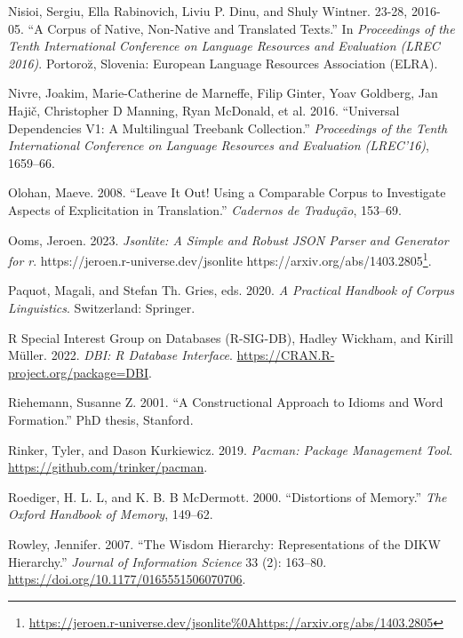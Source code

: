 \documentclass[
  letterpaper,
  DIV=11,
  numbers=noendperiod]{scrreport}
\newlength{\cslhangindent}
\newlength{\cslentryspacingunit} %
\newenvironment{CSLReferences}[2] %
 {%
  \setlength{\parindent}{0pt}
  \ifodd #1
  \let\oldpar\par
  \def\par{\hangindent=\cslhangindent\oldpar}
  \fi
  \setlength{\parskip}{#2\cslentryspacingunit}
 }%
 {}
\theoremstyle{definition}
\theoremstyle{remark}
\DeclareRobustCommand{\href}[2]{#2\footnote{\url{#1}}}
\begin{document}
\begin{CSLReferences}{1}{0}
\leavevmode{}%
Nisioi, Sergiu, Ella Rabinovich, Liviu P. Dinu, and Shuly Wintner.
23-28, 2016-05. {``A Corpus of Native, Non-Native and Translated
Texts.''} In \emph{Proceedings of the Tenth International Conference on
Language Resources and Evaluation (LREC 2016)}. Portoro{z̆}, Slovenia:
European Language Resources Association (ELRA).

\leavevmode{}%
Nivre, Joakim, Marie-Catherine de Marneffe, Filip Ginter, Yoav Goldberg,
Jan Hajič, Christopher D Manning, Ryan McDonald, et al. 2016.
{``Universal Dependencies V1: A Multilingual Treebank Collection.''}
\emph{Proceedings of the Tenth International Conference on Language
Resources and Evaluation (LREC'16)}, 1659--66.

\leavevmode{}%
Olohan, Maeve. 2008. {``Leave It Out! Using a Comparable Corpus to
Investigate Aspects of Explicitation in Translation.''} \emph{Cadernos
de Tradução}, 153--69.

\leavevmode{}%
Ooms, Jeroen. 2023. \emph{Jsonlite: A Simple and Robust JSON Parser and
Generator for r}.
\href{https://jeroen.r-universe.dev/jsonlite\%0Ahttps://arxiv.org/abs/1403.2805}{https://jeroen.r-universe.dev/jsonlite
https://arxiv.org/abs/1403.2805}.

\leavevmode{}%
Paquot, Magali, and Stefan Th. Gries, eds. 2020. \emph{A Practical
Handbook of Corpus Linguistics}. Switzerland: Springer.

\leavevmode{}%
R Special Interest Group on Databases (R-SIG-DB), Hadley Wickham, and
Kirill Müller. 2022. \emph{DBI: R Database Interface}.
\url{https://CRAN.R-project.org/package=DBI}.

\leavevmode{}%
Riehemann, Susanne Z. 2001. {``A Constructional Approach to Idioms and
Word Formation.''} PhD thesis, Stanford.

\leavevmode{}%
Rinker, Tyler, and Dason Kurkiewicz. 2019. \emph{Pacman: Package
Management Tool}. \url{https://github.com/trinker/pacman}.

\leavevmode{}%
Roediger, H. L. L, and K. B. B McDermott. 2000. {``Distortions of
Memory.''} \emph{The Oxford Handbook of Memory}, 149--62.

\leavevmode{}%
Rowley, Jennifer. 2007. {``The Wisdom Hierarchy: Representations of the
DIKW Hierarchy.''} \emph{Journal of Information Science} 33 (2):
163--80. \url{https://doi.org/10.1177/0165551506070706}.


\end{CSLReferences}
\end{document}

